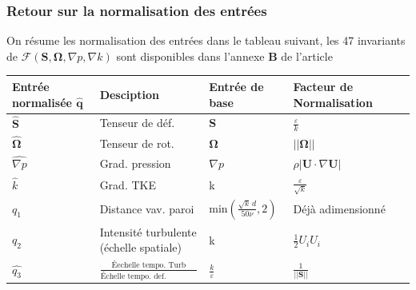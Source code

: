 \documentclass[a4paper,12pt]{report}
\newcommand{\bepar}[1]{
	\left( #1 \right)  
}
\newcommand{\norm}[1]{
	\left \vert \left \vert #1 \right \vert  \right \vert
}
\numberwithin{equation}{section} %
\begin{document}
\subsubsection*{Retour sur la normalisation des entrées}
On résume les normalisation des entrées dans le tableau suivant, les 47 invariants de $\mathcal{F}\bepar{\textbf{S}, \mathbf{\Omega}, \nabla p, \nabla k}$ sont disponibles dans l'annexe \textbf{B} de l'article \cite{wu2018data}

\begin{table}[!ht]
\centering
	\begin{tabular}{M{0.15\textwidth}| M{.3\textwidth} M{0.18\textwidth} M{0.3\textwidth} N}
	\hline
	Entrée normalisée $\hat{\textbf{q}}$ & Desciption & Entrée de base & Facteur de Normalisation &\\[8mm]\hline
	$\hat{\textbf{S}}$ & Tenseur de déf. & \textbf{S} &$ \displaystyle\frac{\varepsilon}{k}$ &\\[5mm] \hline
	$\hat{\mathbf{\Omega}}$ & Tenseur de rot. & $\mathbf{\Omega}$  &$ \norm{\mathbf{\Omega}}$ &\\[5mm] \hline
	$\widehat{\nabla p}$ & Grad. pression & $\nabla p$  &$ \rho \left \vert \textbf{U} \cdot \nabla \textbf{U} \right \vert$ &\\[5mm] \hline
	$\widehat{k}$ & Grad. TKE & k &$ \displaystyle\frac{\varepsilon}{\sqrt{k}}$ &\\[5mm] \hline
	$q_1$ & Distance vav. paroi & $\displaystyle \text{min}\bepar{\frac{\sqrt{k}\, d}{50 \nu}, 2}$  & Déjà adimensionné &\\[12mm] \hline
	$q_2$ & Intensité turbulente (échelle spatiale) & k &$ \displaystyle\frac{1}{2}U_i U_i$ &\\[12mm] \hline
	$\widehat{q_3}$ & $\displaystyle \frac{\text{Éechelle tempo. Turb}}{\text{Échelle tempo. def. moyenne}}$  & $\displaystyle \frac{k}{\varepsilon}$  &$ \displaystyle \frac{1}{\norm{\textbf{S}}}$ &\\[12mm] \hline
	\end{tabular}
\end{table}

\pagebreak



\end{document}
